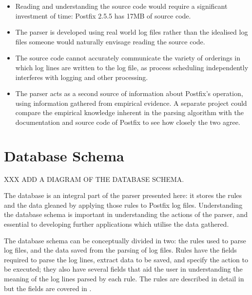 \begin{itemize}

    \item Reading and understanding the source code would require a
        significant investment of time: Postfix 2.5.5 has 17MB of source
        code.  

    \item The parser is developed using real world log files rather than
        the idealised log files someone would naturally envisage reading
        the source code.

    \item The source code cannot accurately communicate the variety of
        orderings in which log lines are written to the log file, as
        process scheduling independently interferes with logging and other
        processing.

    \item The parser acts as a second source of information about Postfix's
        operation, using information gathered from empirical evidence.  A
        separate project could compare the empirical knowledge inherent in
        the parsing algorithm with the documentation and source code of
        Postfix to see how closely the two agree.

\end{itemize}



\section{Database Schema}
\label{database schema}

XXX ADD A DIAGRAM OF THE DATABASE SCHEMA\@.

The database is an integral part of the parser presented here: it stores
the rules and the data gleaned by applying those rules to Postfix log
files.  Understanding the database schema is important in understanding the
actions of the parser, and essential to developing further applications
which utilise the data gathered.

The database schema can be conceptually divided in two: the rules used to
parse log files, and the data saved from the parsing of log files.  Rules
have the fields required to parse the log lines, extract data to be saved,
and specify the action to be executed; they also have several fields that
aid the user in understanding the meaning of the log lines parsed by each
rule.  The rules are described in detail in  but the fields are covered in .

